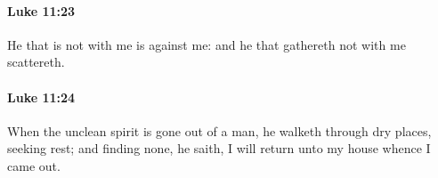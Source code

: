 		\paragraph{Luke 11:23} %
			\label{LUKE-11-23}

			He that is not with me is against me: and he that gathereth not with me scattereth.

			\begin{framed}
			\scriptsize
				\begin{compactdesc}
					\item[SBLG] 
				\end{compactdesc}
			\end{framed}

		\paragraph{Luke 11:24} %
			\label{LUKE-11-24}

			When the unclean spirit is gone out of a man, he walketh through dry places, seeking rest; and finding none, he saith, I will return unto my house whence I came out.

